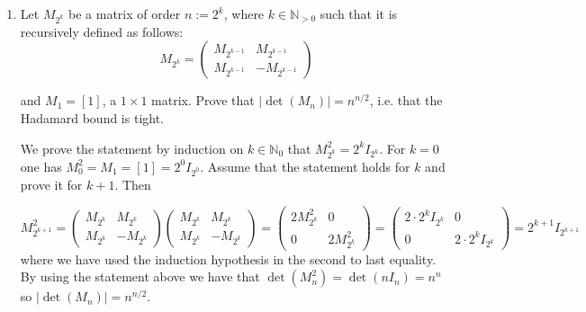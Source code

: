 \documentclass[11pt]{article}
\newcommand{\setN}{\mathbb{N}}
\begin{document}
\begin{enumerate}[1)]
\begin{solution}
\end{solution}


\item Let $M_{2^k}$ be a matrix of order $n:= 2^k$, where $k∈\setN_{>0}$ such that it is recursively defined as follows:
$$M_{2^k} = \begin{pmatrix} M_{2^{k−1}} &  M_{2^{k−1}} \\ M_{2^{k−1}} & −M_{2^{k−1}} \end{pmatrix} $$

and $M_1 = [1]$, a $1 \times 1$ matrix. Prove that $|\det(M_n)|= n^{n/2}$, i.e. that the Hadamard bound is tight.

\begin{solution}
We prove the statement by induction on $k∈\setN_0$ that $M^2_{2^k} = 2^kI_{2^k}$. For $k= 0$ one has $M^2_0 = M_1 =[1] = 2^0I_{2^0}$. Assume that the statement holds for $k$ and prove it for $k+ 1$. Then 


$$M^2_{2^{k+1}} = \begin{pmatrix} M_{2^{k}} &  M_{2^{k}} \\ M_{2^{k}} & −M_{2^{k}} \end{pmatrix} \begin{pmatrix} M_{2^{k}} &  M_{2^{k}} \\ M_{2^{k}} & −M_{2^{k}} \end{pmatrix} = \begin{pmatrix} 2M^2_{2^k} & 0  \\ 0 & 2M^2_{2^k} \end{pmatrix} = \begin{pmatrix} 2\cdot 2^k I_{2^k} & 0  \\ 0 & 2\cdot 2^k I_{2^k} \end{pmatrix} = 2^{k+1}I_{2^{k+1}}$$
where we have used the induction hypothesis in the second to last equality.
By using the statement above we have that $\det(M^2_n) = \det(n I_n) = n^n$ so $|\det(M_n)|= n^{n/2}.$
\end{solution}



\end{enumerate}
\end{document}
